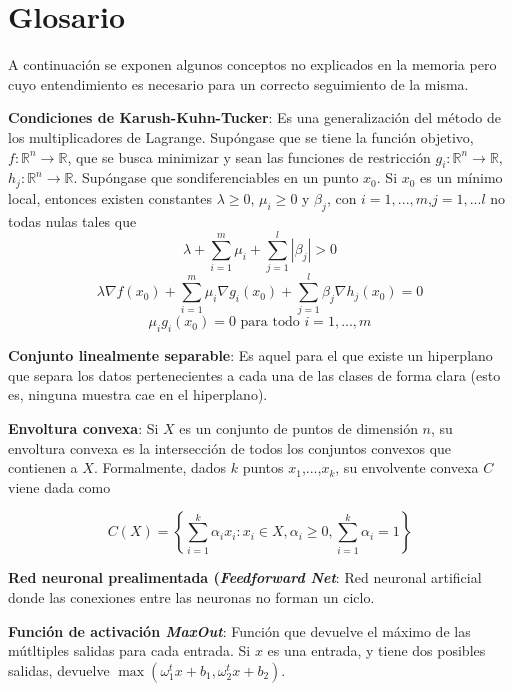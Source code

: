 
\chapter{Glosario}

A continuación se exponen algunos conceptos no explicados en la memoria pero cuyo entendimiento es necesario para un correcto seguimiento de la misma.

\begin{description} 
  \item \textbf{Condiciones de Karush-Kuhn-Tucker}: Es una generalización del método de los multiplicadores de Lagrange. Supóngase que se tiene la función objetivo, $f: \mathbb{R}^n \to \mathbb{R}$, que se busca minimizar y sean las funciones de restricción $g_i : \mathbb{R}^n \to \mathbb{R}$, $h_j: \mathbb{R}^n \to \mathbb{R}$. Supóngase que sondiferenciables en un punto $x_0$. Si $x_0$ es un mínimo local, entonces existen constantes $\lambda \geq 0$, $\mu_i \geq 0$ y $\beta_j$, con $i=1,...,m$,$j=1,...l$ no todas nulas tales que 
  $$\lambda + \sum_{i=1}^m \mu_i + \sum_{j=1}^l | \beta_j | >0$$
  $$\lambda \nabla f(x_0) + \sum_{i=1}^m \mu_i \nabla g_i (x_0) + \sum_{j=1}^l \beta_j \nabla h_j (x_0) = 0$$
  $$\mu_i g_i(x_0) = 0 \text{ para todo } i=1,...,m$$

  \item \textbf{Conjunto linealmente separable}: Es aquel para el que existe un hiperplano que separa los datos pertenecientes a cada una de las clases de forma clara (esto es, ninguna muestra cae en el hiperplano).

  \item \textbf{Envoltura convexa}: Si $X$ es un conjunto de puntos de dimensión $n$, su envoltura convexa es la intersección de todos los conjuntos convexos que contienen a $X$. Formalmente, dados $k$ puntos $x_1$,...,$x_k$, su envolvente convexa $C$ viene dada como

  $$C(X) = \left\{ \sum_{i=1}^k \alpha_i x_i : x_i \in X, \alpha_i \geq 0, \sum_{i=1}^k \alpha_i = 1 \right\}$$

  \item \textbf{Red neuronal prealimentada (\textit{Feedforward Net}}: Red neuronal artificial donde las conexiones entre las neuronas no forman un ciclo.

  \item \textbf{Función de activación \textit{MaxOut}}: Función que devuelve el máximo de las mútltiples salidas para cada entrada. Si $x$ es una entrada, y tiene dos posibles salidas, devuelve $\max (\omega_1^t x + b_1, \omega_2^t x + b_2)$.


\end{description}
